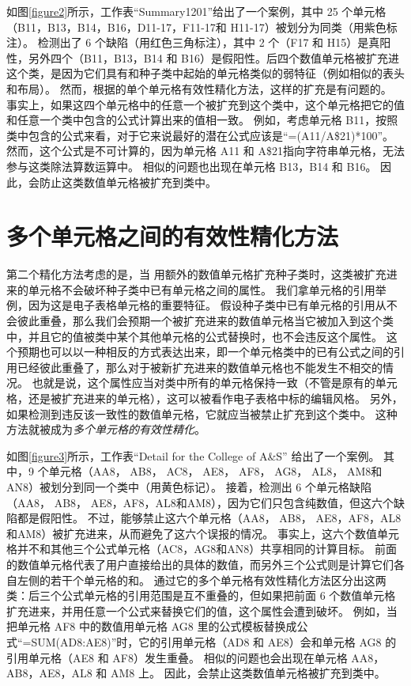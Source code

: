 如图\ref{figure2}所示，工作表“Summary1201”给出了一个案例，其中 25 个单元格（B11，B13，B14，B16，D11-17，F11-17和 H11-17）被\cu 划分为同类（用紫色标注）。
\cu 检测出了 6 个缺陷（用红色三角标注），其中 2 个（F17 和 H15）是真阳性，另外四个（B11，B13，B14 和 B16）是假阳性。后四个数值单元格被扩充进这个类，是因为它们具有和种子类中起始的单元格类似的弱特征（例如相似的表头和布局）。
然而，根据\wa 的单个单元格有效性精化方法，这样的扩充是有问题的。
事实上，如果这四个单元格中的任意一个被扩充到这个类中，这个单元格把它的值和任意一个类中包含的公式计算出来的值相一致。
例如，考虑单元格 B11，按照类中包含的公式来看，对于它来说最好的潜在公式应该是“=(A11/A\$21)*100”。
然而，这个公式是不可计算的，因为单元格 A11 和 A\$21指向字符串单元格，无法参与这类除法算数运算中。
相似的问题也出现在单元格 B13，B14 和 B16。 
因此，\wa 会防止这类数值单元格被扩充到类中。


\section{多个单元格之间的有效性精化方法}

第二个精化方法考虑的是，当 \wa 用额外的数值单元格扩充种子类时，这类被扩充进来的单元格不会破坏种子类中已有单元格之间的属性。
我们拿单元格的引用举例，因为这是电子表格单元格的重要特征。
假设种子类中已有单元格的引用从不会彼此重叠，那么我们会预期一个被扩充进来的数值单元格当它被加入到这个类中，并且它的值被类中某个其他单元格的公式替换时，也不会违反这个属性。
这个预期也可以以一种相反的方式表达出来，即一个单元格类中的已有公式之间的引用已经彼此重叠了，那么对于被新扩充进来的数值单元格也不能发生不相交的情况。
也就是说，这个属性应当对类中所有的单元格保持一致（不管是原有的单元格，还是被扩充进来的单元格），这可以被看作电子表格中标的编辑风格。
另外，如果检测到违反该一致性的数值单元格，它就应当被禁止扩充到这个类中。
这种方法就被成为\textit{多个单元格的有效性精化}。

如图\ref{figure3}所示，工作表“Detail for the College of A\&S” 给出了一个案例。
其中，9 个单元格（AA8， AB8， AC8， AE8， AF8， AG8， AL8， AM8和AN8）被\cu 划分到同一个类中（用黄色标记）。
接着，\cu 检测出 6 个单元格缺陷（AA8， AB8， AE8，AF8，AL8和AM8），因为它们只包含纯数值，但这六个缺陷都是假阳性。
不过，\wa 能够禁止这六个单元格（AA8， AB8， AE8，AF8，AL8和AM8）被扩充进来，从而避免了这六个误报的情况。
事实上，这六个数值单元格并不和其他三个公式单元格（AC8，AG8和AN8）共享相同的计算目标。
前面的数值单元格代表了用户直接给出的具体的数值，而另外三个公式则是计算它们各自左侧的若干个单元格的和。
\wa 通过它的多个单元格有效性精化方法区分出这两类：后三个公式单元格的引用范围是互不重叠的，但如果把前面 6 个数值单元格扩充进来，并用任意一个公式来替换它们的值，这个属性会遭到破坏。
例如，当把单元格 AF8 中的数值用单元格 AG8 里的公式模板替换成公式“=SUM(AD8:AE8)”时，它的引用单元格（AD8 和 AE8）会和单元格 AG8 的引用单元格（AE8 和 AF8）发生重叠。
相似的问题也会出现在单元格 AA8，AB8，AE8，AL8 和 AM8 上。
因此，\wa 会禁止这类数值单元格被扩充到类中。


